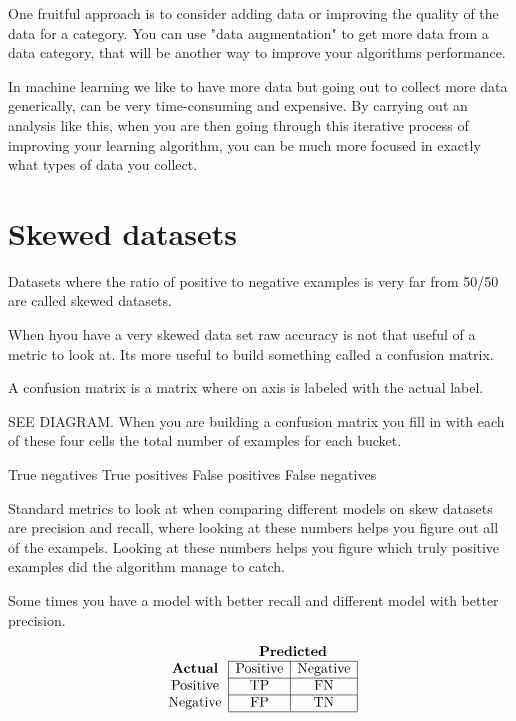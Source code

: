 One fruitful approach is to consider adding data or improving the quality of the data for a category.
You can use "data augmentation" to get more data from a data category, that will be another way to improve your algorithms performance.

In machine learning we like to have more data but going out to collect more data generically, can be very time-consuming and expensive.
By carrying out an analysis like this, when you are then going through this iterative process of improving your learning algorithm, you can be much more focused in exactly what types of data you collect.

\section{Skewed datasets}

Datasets where the ratio of positive to negative examples is very far from 50/50 are called skewed datasets.

When hyou have a very skewed data set raw accuracy is not that useful of a metric to look at.
Its more useful to build something called a confusion matrix.

A confusion matrix is a matrix where on axis is labeled with the actual label.

SEE DIAGRAM. When you are building a confusion matrix you fill in with each of these four cells the total number of examples for each bucket.

True negatives
True positives
False positives
False negatives



Standard metrics to look at when comparing different models on skew datasets are precision and recall, where looking at these numbers helps you figure out all of the exampels.
Looking at these numbers helps you figure which truly positive examples did the algorithm manage to catch.

Some times you have a model with better recall and different model with better precision.

\[
    \begin{array}{c|c|c|}
        \multicolumn{1}{c}{} & \multicolumn{2}{c}{\textbf{Predicted}} \\
        \cline{2-3}
        \textbf{Actual} & \text{Positive} & \text{Negative} \\
        \cline{2-3}
        \text{Positive} & \text{TP} & \text{FN} \\
        \cline{2-3}
        \text{Negative} & \text{FP} & \text{TN} \\
        \cline{2-3}
    \end{array}
\]

